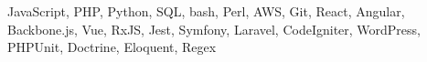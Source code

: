 \documentclass[margin,line]{resume}
\begin{document}
\begin{resume}
JavaScript, PHP, Python, SQL, bash, Perl, AWS, Git, React, Angular, Backbone.js, Vue, RxJS, Jest, Symfony, Laravel, CodeIgniter, WordPress, PHPUnit, Doctrine, Eloquent, Regex














\end{resume}
\end{document}
